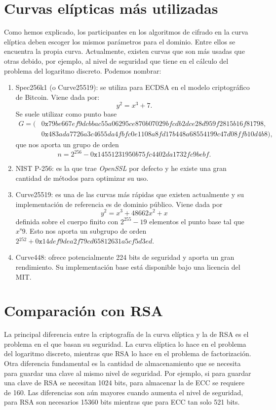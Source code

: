 \documentclass[11pt]{article}
\begin{document}
\section{Curvas elípticas más utilizadas}
Como hemos explicado, los participantes en los algoritmos de cifrado en la curva elíptica deben escoger los mismos parámetros para el dominio. Entre ellos se encuentra la propia curva. Actualmente, existen curvas que son más usadas que otras debido, por ejemplo, al nivel de seguridad que tiene en el cálculo del problema del logaritmo discreto. Podemos nombrar:
\begin{enumerate}
\item Spec256k1 (o Curve25519): se utiliza para ECDSA en el modelo criptográfico de Bitcoin. Viene dada por:
\[
y^2 = x^3 + 7.
\]
Se suele utilizar como punto base
\begin{equation*}
\begin{split}
G = (&0\texttt{x}79be667ef9dcbbac55a06295ce870b07029bfcdb2dce28d959f2815b16f81798, \\
		&0\texttt{x}483ada7726a3c4655da4fbfc0e1108a8fd17b448a68554199c47d08ffb10d4b8),
\end{split}
\end{equation*}
que nos aporta un grupo de orden
\[
n =2^{256}-0\texttt{x}14551231950b75fc4402da1732fc9bebf.
\]

\item NIST P-256: es la que trae \textit{OpenSSL} por defecto y he existe una gran cantidad de métodos para optimizar su uso. \\

\item Curve25519: es una de las curvas más rápidas que existen actualmente y su implementación de referencia es de dominio público. Viene dada por
\[
y^2 = x^3 + 48662x^2 + x
\]
definida sobre el cuerpo finito con $ 2^{255} - 19 $ elementos el punto base tal que $ x ⁼ 9 $. Esto nos aporta un subgrupo de orden $ 2{^252 }+ 0\texttt{x}14def9dea2f79cd65812631a5cf5d3ed $. \\

\item  Curve448: ofrece potencialmente 224 bits de seguridad y aporta un gran rendimiento. Su implementación base está disponible bajo una licencia del MIT. \\
\end{enumerate}
\section{Comparación con RSA}
\label{sec:RSA}
La principal diferencia entre la criptografía de la curva elíptica y la de RSA es el problema en el que basan su seguridad. La curva elíptica lo hace en el problema del logaritmo discreto, mientras que RSA lo hace en el problema de factorización. Otra diferencia fundamental es la cantidad de almacenamiento que se necesita para guardar una clave al mismo nivel de seguridad. Por ejemplo, si para guardar una clave de RSA se necesitan 1024 bits, para almacenar la de ECC se requiere de 160. Las diferencias son aún mayores cuando aumenta el nivel de seguridad, para RSA son necesarios 15360 bits mientras que para ECC tan solo 521 bits.
\end{document}
